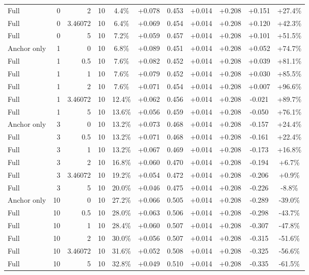 \begin{table}[htbp]
\begin{tabular}{lrrrccccccc}
Full & 0 & 2 & 10 & 4.4\% & +0.078 & 0.453 & +0.014 & +0.208 & +0.151 & +27.4\% \\
Full & 0 & 3.46072 & 10 & 6.4\% & +0.069 & 0.454 & +0.014 & +0.208 & +0.120 & +42.3\% \\
Full & 0 & 5 & 10 & 7.2\% & +0.059 & 0.457 & +0.014 & +0.208 & +0.101 & +51.5\% \\
Anchor only & 1 & 0 & 10 & 6.8\% & +0.089 & 0.451 & +0.014 & +0.208 & +0.052 & +74.7\% \\
Full & 1 & 0.5 & 10 & 7.6\% & +0.082 & 0.452 & +0.014 & +0.208 & +0.039 & +81.1\% \\
Full & 1 & 1 & 10 & 7.6\% & +0.079 & 0.452 & +0.014 & +0.208 & +0.030 & +85.5\% \\
Full & 1 & 2 & 10 & 7.6\% & +0.071 & 0.454 & +0.014 & +0.208 & +0.007 & +96.6\% \\
Full & 1 & 3.46072 & 10 & 12.4\% & +0.062 & 0.456 & +0.014 & +0.208 & -0.021 & +89.7\% \\
Full & 1 & 5 & 10 & 13.6\% & +0.056 & 0.459 & +0.014 & +0.208 & -0.050 & +76.1\% \\
Anchor only & 3 & 0 & 10 & 13.2\% & +0.073 & 0.468 & +0.014 & +0.208 & -0.157 & +24.4\% \\
Full & 3 & 0.5 & 10 & 13.2\% & +0.071 & 0.468 & +0.014 & +0.208 & -0.161 & +22.4\% \\
Full & 3 & 1 & 10 & 13.2\% & +0.067 & 0.469 & +0.014 & +0.208 & -0.173 & +16.8\% \\
Full & 3 & 2 & 10 & 16.8\% & +0.060 & 0.470 & +0.014 & +0.208 & -0.194 & +6.7\% \\
Full & 3 & 3.46072 & 10 & 19.2\% & +0.054 & 0.472 & +0.014 & +0.208 & -0.206 & +0.9\% \\
Full & 3 & 5 & 10 & 20.0\% & +0.046 & 0.475 & +0.014 & +0.208 & -0.226 & -8.8\% \\
Anchor only & 10 & 0 & 10 & 27.2\% & +0.066 & 0.505 & +0.014 & +0.208 & -0.289 & -39.0\% \\
Full & 10 & 0.5 & 10 & 28.0\% & +0.063 & 0.506 & +0.014 & +0.208 & -0.298 & -43.7\% \\
Full & 10 & 1 & 10 & 28.4\% & +0.060 & 0.507 & +0.014 & +0.208 & -0.307 & -47.8\% \\
Full & 10 & 2 & 10 & 30.0\% & +0.056 & 0.507 & +0.014 & +0.208 & -0.315 & -51.6\% \\
Full & 10 & 3.46072 & 10 & 31.6\% & +0.052 & 0.508 & +0.014 & +0.208 & -0.325 & -56.6\% \\
Full & 10 & 5 & 10 & 32.8\% & +0.049 & 0.510 & +0.014 & +0.208 & -0.335 & -61.5\% \\

\end{tabular}
\end{table}
